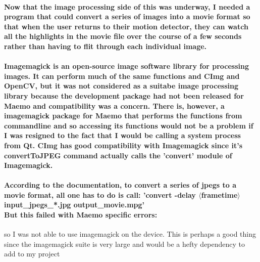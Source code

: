 \paragraph{Now that the image processing side of this was underway, I needed a program that could convert a series of images into a movie format so that when the user returns to their motion detector, they can watch all the highlights in the movie file over the course of a few seconds rather than having to flit through each individual image.
}
\paragraph{Imagemagick is an open-source image software library for processing images. It can perform much of the same functions and CImg and OpenCV, but it was not considered as a suitabe image processing library because the development package had not been released for Maemo and compatibility was a concern. There is, however, a imagemagick package for Maemo that performs the functions from commandline and so accessing its functions would not be a problem if I was resigned to the fact that I would be calling a system process from Qt. CImg has good compatibility with Imagemagick since it's convertToJPEG command actually calls the 'convert' module of Imagemagick.}
\paragraph{
According to the documentation, to convert a series of jpegs to a movie format, all one has to do is call:
'convert -delay \(\langle\)frametime\(\rangle\) input\_jpegs\_*.jpg output\_movie.mpg'\\
But this failed with Maemo specific errors:\\}
\vspace{-20pt}
\begin{frame}[fragile]

\end{frame}
so I was not able to use imagemagick on the device. This is perhaps a good thing since the imagemagick suite is very large and would be a hefty dependency to add to my project

